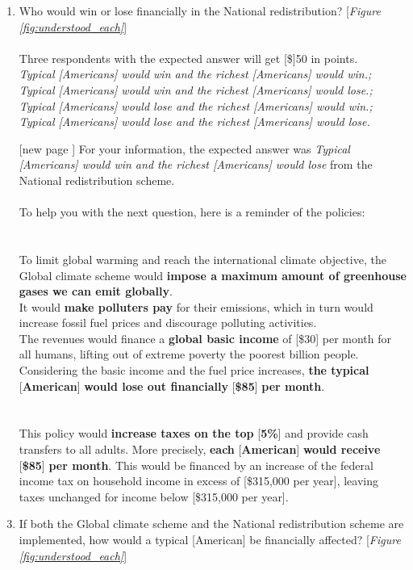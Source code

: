 \documentclass[12pt,english]{article}
\begin{document}
\begin{enumerate}[resume]
\item \label{q:understood_nr} Who would win or lose financially in the National redistribution? [\textit{Figure \ref{fig:understood_each}}] ~\\
\\
Three respondents with the expected answer will get [\$]50 in points.
\\ \textit{Typical [Americans] would win and the richest [Americans] would win.; Typical [Americans] would win and the richest [Americans] would lose.; Typical [Americans] would lose and the richest [Americans] would win.; Typical [Americans] would lose and the richest [Americans] would lose.}
\item[[new page\!\!\!]] For your information, the expected answer was \textit{Typical [Americans] would win and the richest [Americans] would lose} from the National redistribution scheme. \\ 
\\
To help you with the next question, here is a reminder of the policies:\\
\\
\textbf{}\\ 
To limit global warming and reach the international climate objective, the Global climate scheme would \textbf{impose a maximum amount of greenhouse gases we can emit globally}.\\
It would \textbf{make polluters pay} for their emissions, which in turn would increase fossil fuel prices and discourage polluting activities.\\
The revenues would finance a \textbf{global basic income} of [\$30] per month for all humans, lifting out of extreme poverty the poorest billion people.\\
Considering the basic income and the fuel price increases, \textbf{the typical }[\textbf{American}]\textbf{ would lose out financially }[\textbf{\$85}]\textbf{ per month}.\\
\\
\textbf{} \\This policy would \textbf{increase taxes on the top }[\textbf{5\%}] and provide cash transfers to all adults. More precisely, \textbf{each }[\textbf{American}]\textbf{ would receive }[\textbf{\$85}]\textbf{ per month}. This would be financed by an increase of the federal income tax on household income in excess of [\$315,000 per year], leaving taxes unchanged for income below [\$315,000 per year].
\item \label{q:understood_both} If both the Global climate scheme and the National redistribution scheme are implemented, how would a typical [American] be financially affected? [\textit{Figure \ref{fig:understood_each}}] \\

\end{enumerate}
\end{document}
